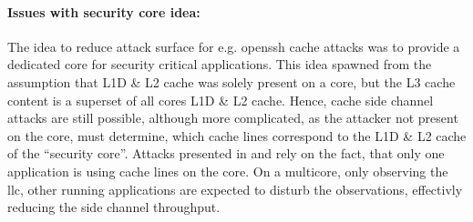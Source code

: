 \paragraph{Issues with security core idea:}
The idea to reduce attack surface for e.g. openssh cache attacks was to provide
a dedicated core for security critical applications.
This idea spawned from the assumption that L1D \& L2 cache was solely present
on a core, but the L3 cache content is a superset of all cores L1D \& L2 cache.
Hence, cache side channel attacks are still possible, although more
complicated, as the attacker not present on the core, must determine, which
cache lines correspond to the L1D \& L2 cache of the ``security core''.
Attacks presented in \cite{yarom_recovering_2014} and
\cite{bernstein_cache-timing_2005} rely on the fact, that only one application
is using cache lines on the core.
On a multicore, only observing the \gls{llc}, other running applications are
expected to disturb the observations, effectivly reducing the side channel
throughput.

